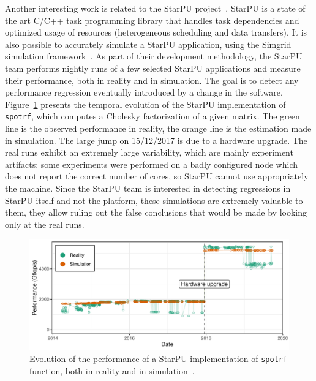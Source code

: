                 Another interesting work is related to the StarPU project~\cite{AugThiNamWac11CCPE}. StarPU is a state
                of the art C/C++ task programming library that handles task dependencies and optimized usage of
                resources (heterogeneous scheduling and data transfers). It is also possible to accurately simulate a
                StarPU application, using the Simgrid simulation framework~\cite{stanisic:hal-01147997}. As part of
                their development methodology, the StarPU team performs nightly runs of a few selected StarPU
                applications and measure their performance, both in reality and in simulation. The goal is to detect any
                performance regression eventually introduced by a change in the software.
                Figure~\ref{fig:non_regression:state_of_art:starpu} presents the temporal evolution of the StarPU
                implementation of \texttt{spotrf}, which computes a Cholesky factorization of a given matrix. The green
                line is the observed performance in reality, the orange line is the estimation made in simulation. The
                large jump on 15/12/2017 is due to a hardware upgrade. The real runs exhibit an extremely large
                variability, which are mainly experiment artifacts: some experiments were performed on a badly
                configured node which does not report the correct number of cores, so StarPU cannot use appropriately
                the machine.  Since the StarPU team is interested in detecting regressions in StarPU itself and not the
                platform, these simulations are extremely valuable to them, they allow ruling out the false conclusions
                that would be made by looking only at the real runs.
                \begin{figure}[htpb]
                    \centering
                    \includegraphics[width=\linewidth]{img/experiment/non_regression/state_of_art/starpu_new.pdf}
                    \caption{Evolution of the performance of a StarPU implementation of \texttt{spotrf} function, both
                    in reality and in simulation~\cite{thibault:hal-02943753}.}%
                    \label{fig:non_regression:state_of_art:starpu}
                \end{figure}

